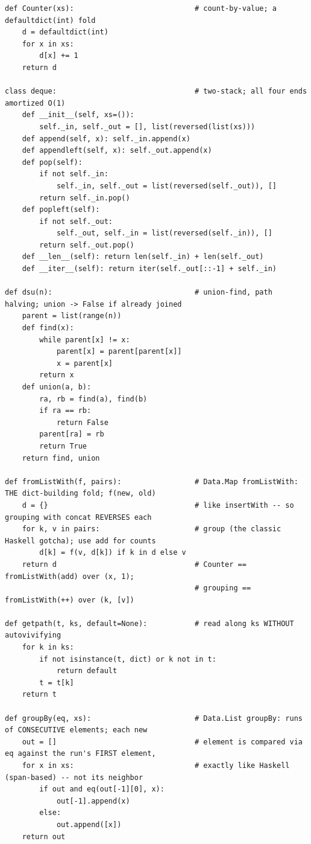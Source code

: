 \documentclass[11pt,letterpaper]{book}
\begin{document}
\begin{lstlisting}[style=file]
def Counter(xs):                            # count-by-value; a defaultdict(int) fold
    d = defaultdict(int)
    for x in xs:
        d[x] += 1
    return d

class deque:                                # two-stack; all four ends amortized O(1)
    def __init__(self, xs=()):
        self._in, self._out = [], list(reversed(list(xs)))
    def append(self, x): self._in.append(x)
    def appendleft(self, x): self._out.append(x)
    def pop(self):
        if not self._in:
            self._in, self._out = list(reversed(self._out)), []
        return self._in.pop()
    def popleft(self):
        if not self._out:
            self._out, self._in = list(reversed(self._in)), []
        return self._out.pop()
    def __len__(self): return len(self._in) + len(self._out)
    def __iter__(self): return iter(self._out[::-1] + self._in)

def dsu(n):                                 # union-find, path halving; union -> False if already joined
    parent = list(range(n))
    def find(x):
        while parent[x] != x:
            parent[x] = parent[parent[x]]
            x = parent[x]
        return x
    def union(a, b):
        ra, rb = find(a), find(b)
        if ra == rb:
            return False
        parent[ra] = rb
        return True
    return find, union

def fromListWith(f, pairs):                 # Data.Map fromListWith: THE dict-building fold; f(new, old)
    d = {}                                  # like insertWith -- so grouping with concat REVERSES each
    for k, v in pairs:                      # group (the classic Haskell gotcha); use add for counts
        d[k] = f(v, d[k]) if k in d else v
    return d                                # Counter == fromListWith(add) over (x, 1);
                                            # grouping == fromListWith(++) over (k, [v])

def getpath(t, ks, default=None):           # read along ks WITHOUT autovivifying
    for k in ks:
        if not isinstance(t, dict) or k not in t:
            return default
        t = t[k]
    return t

def groupBy(eq, xs):                        # Data.List groupBy: runs of CONSECUTIVE elements; each new
    out = []                                # element is compared via eq against the run's FIRST element,
    for x in xs:                            # exactly like Haskell (span-based) -- not its neighbor
        if out and eq(out[-1][0], x):
            out[-1].append(x)
        else:
            out.append([x])
    return out


\end{lstlisting}
\end{document}
